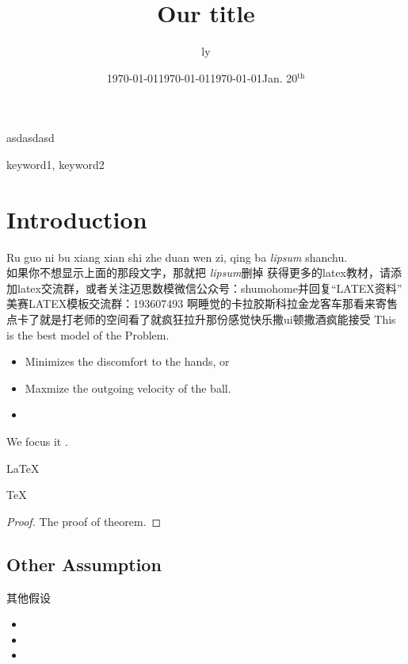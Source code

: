 \documentclass{mcmthesis}
\title{Our title}
\author{ly}
\date{\today}
\begin{document}
\begin{sheetsummary}
\lipsum[1]
asdasdasd\\
\date{\today}
\end{sheetsummary}

\begin{keywords}
keyword1, keyword2
\end{keywords}

\maketitle
\tableofcontents
\newpage

\section{Introduction}
\lipsum[3]
Ru guo ni bu xiang xian shi zhe duan wen zi, qing ba \textit{lipsum} shanchu.\\
如果你不想显示上面的那段文字，那就把 \textit{lipsum}删掉
获得更多的latex教材，请添加latex交流群，或者关注迈思数模微信公众号：shumohome并回复“LATEX资料”
美赛LATEX模板交流群：193607493
啊睡觉的卡拉胶斯科拉金龙客车那看来寄售点卡了就是打老师的空间看了就疯狂拉升那份感觉快乐撒ui顿撒酒疯能接受
This is the best model of the Problem.\\

\begin{itemize}
\item Minimizes the discomfort to the hands, or
\item Maxmize the outgoing velocity of the ball.
\item
\end{itemize}
We focus it .
\begin{Theorem} \label{thm:tex}
\LaTeX
\end{Theorem}
\begin{Lemma} \label{thm:tex}
\TeX
\end{Lemma}
\begin{proof}
The proof of theorem.
\end{proof}

\date{\today}
\date{Jan. 20$^{\text{th}}$}
\subsection{Other Assumption}
其他假设\\


\begin{itemize}
\item 
\item
\item
\end{itemize}
\end{document}
